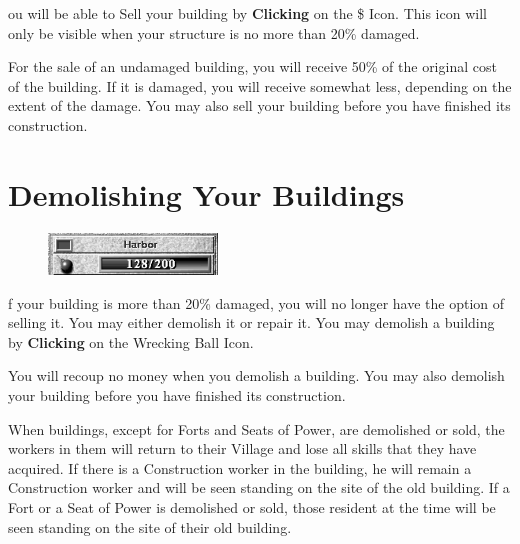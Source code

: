 
ou will be able to Sell your building by \textbf{Clicking} on the \$ Icon. This icon will only be visible when your structure is no more than 20\% damaged.

For the sale of an undamaged building, you will receive 50\% of the original cost of the building. If it is damaged, you will receive somewhat less, depending on the extent of the damage. You may also sell your building before you have finished its construction.

\section{\textsf{Demolishing Your Buildings}}

    
\begin{figure}
    \vspace{-20pt}
    \begin{center}
        \includegraphics[width=0.4\textwidth]{Idamage}
    \end{center}
    \vspace{-20pt}
\end{figure}


f your building is more than 20\% damaged, you will no longer have the option of selling it. You may either demolish it or repair it. You may demolish a building by \textbf{Clicking} on the Wrecking Ball Icon.

You will recoup no money when you demolish a building. You may also demolish your building before you have finished its construction.


When buildings, except for Forts and Seats of Power, are demolished or sold, the workers in them will return to their Village and lose all skills that they have acquired. If there is a Construction worker in the building, he will remain a Construction worker and will be seen standing on the site of the old building. If a Fort or a Seat of Power is demolished or sold, those resident at the time will be seen standing on the site of their old building.

